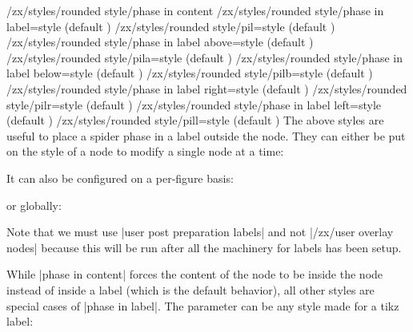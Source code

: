 \documentclass[a4paper,doc2]{ltxdoc} %
\begin{document}
{\begin{pgfmanualentry}
  \makeatletter
  \def\extrakeytext{style, }
  \extractkey/zx/styles/rounded style/phase in content\@nil%
  \extractkey/zx/styles/rounded style/phase in label=style (default {})\@nil%
  \extractkey/zx/styles/rounded style/pil=style (default {})\@nil%
  \extractkey/zx/styles/rounded style/phase in label above=style (default {})\@nil%
  \extractkey/zx/styles/rounded style/pila=style (default {})\@nil%
  \extractkey/zx/styles/rounded style/phase in label below=style (default {})\@nil%
  \extractkey/zx/styles/rounded style/pilb=style (default {})\@nil%
  \extractkey/zx/styles/rounded style/phase in label right=style (default {})\@nil%
  \extractkey/zx/styles/rounded style/pilr=style (default {})\@nil%
  \extractkey/zx/styles/rounded style/phase in label left=style (default {})\@nil%
  \extractkey/zx/styles/rounded style/pill=style (default {})\@nil%
  \makeatother
  \pgfmanualbody
  The above styles are useful to place a spider phase in a label outside the node. They can either be put on the style of a node to modify a single node at a time:
\begin{codeexample}[]
\end{codeexample}
\noindent It can also be configured on a per-figure basis:
\begin{codeexample}[]
\end{codeexample}
\noindent or globally:
\begin{codeexample}[]
\end{codeexample}
Note that we must use |user post preparation labels| and not |/zx/user overlay nodes| because this will be run after all the machinery for labels has been setup.

  While |phase in content| forces the content of the node to be inside the node instead of inside a label (which is the default behavior), all other styles are special cases of |phase in label|. The  parameter can be any style made for a tikz label:
\begin{codeexample}[width=3cm]
  \zx{
    \zxX[phase in label={label position=45, text=purple}]{\alpha}
  }
\end{codeexample}


\end{pgfmanualentry}}
\end{document}
